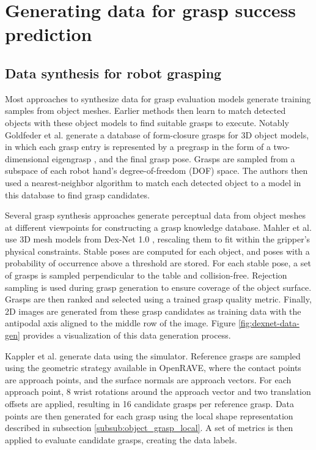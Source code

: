 \section{Generating data for grasp success prediction}

\subsection{Data synthesis for robot grasping} \label{subsub:data_synthesis}

Most approaches to synthesize data for grasp evaluation models generate training samples from object meshes. Earlier
methods then learn to match detected objects with these object models to find suitable grasps to execute. Notably
Goldfeder et al. \cite{Goldfeder2009CGDB} generate a database of form-closure grasps for 3D object models, in which
each grasp entry is represented by a pregrasp in the form of a two-dimensional eigengrasp \cite{Ciocarlie2009}, and the
final grasp pose. Grasps are sampled from a subspace of each robot hand's degree-of-freedom (DOF) space. The authors
then used a nearest-neighbor algorithm to match each detected object to a model in this database \cite{Goldfeder2011}
to find grasp candidates.

Several grasp synthesis approaches generate perceptual data from object meshes at different viewpoints
\cite{mahler2017,Gualtieri2016,Kappler2015} for constructing a grasp knowledge database. Mahler et al. \cite{mahler2017}
use 3D mesh models from Dex-Net 1.0 \cite{mahler2016}, rescaling them to fit within the gripper's physical constraints.
Stable poses are computed for each object, and poses with a probability of occurrence above a threshold are stored.
For each stable pose, a set of grasps is sampled perpendicular to the table and collision-free. Rejection sampling
is used during grasp generation to ensure coverage of the object surface. Grasps are then ranked and selected using
a trained grasp quality metric. Finally, 2D images are generated from these grasp candidates as training data with the
antipodal axis aligned to the middle row of the image. Figure \ref{fig:dexnet-data-gen} provides a visualization of this
data generation process.

Kappler et al. \cite{Kappler2015} generate data using the 
\cite{Diankov2010} simulator. Reference grasps are sampled using the geometric strategy available in OpenRAVE, where the
contact points are approach points, and the surface normals are approach vectors. For each approach point, 8 wrist
rotations around the approach vector and two translation offsets are applied, resulting in 16 candidate grasps per
reference grasp. Data points are then generated for each grasp using the local shape representation described in
subsection \ref{subsub:object_grasp_local}. A set of metrics is then applied to evaluate candidate grasps, creating the
data labels.

